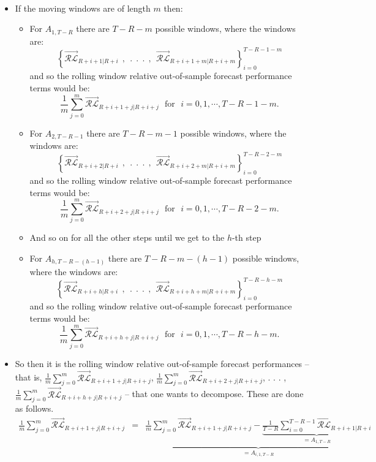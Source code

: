 \documentclass[11pt]{article}
\begin{document}
\begin{itemize}
\begin{eqnarray}
\end{eqnarray}
\item If the moving windows are of length $m$ then:
\begin{itemize}
\item For $A_{1,T\!-\!R}$ there are $T-R-m$ possible windows, where the windows are: 
\[\left\{\overrightarrow{\mathcal{RL}}_{R+i+1|R+i}\ \ , \ \  . \ \  . \ \  . \ \ ,\ \ \overrightarrow{\mathcal{RL}}_{R+i+1+m|R+i+m}\right\}_{i=0}^{T-R-1-m}\] 
and so the rolling window relative out-of-sample forecast performance terms would be:
\[\frac{1}{m}\sum_{j=0}^{m}\overrightarrow{\mathcal{RL}}_{R+i+1+j|R+i+j}\ \ \ \mathrm{for} \ \ \ i=0,1,\cdots,T\!-\!R\!-\!1\!-\!m. \]
\item For $A_{2,T\!-\!R\!-\!1}$ there are $T-R-m-1$ possible windows, where the windows are: 
\[\left\{\overrightarrow{\mathcal{RL}}_{R+i+2|R+i}\ \ , \ \  . \ \  . \ \  . \ \ ,\ \ \overrightarrow{\mathcal{RL}}_{R+i+2+m|R+i+m}\right\}_{i=0}^{T-R-2-m}\] 
and so the rolling window relative out-of-sample forecast performance terms would be:
\[\frac{1}{m}\sum_{j=0}^{m}\overrightarrow{\mathcal{RL}}_{R+i+2+j|R+i+j}\ \ \ \mathrm{for} \ \ \ i=0,1,\cdots,T\!-\!R\!-\!2\!-\!m. \]
\item And so on for all the other steps until we get to the $h$-th step
\item For $A_{h,T\!-\!R\!-\!(h-1)}$ there are $T-R-m-(h-1)$ possible windows, where the windows are: 
\[\left\{\overrightarrow{\mathcal{RL}}_{R+i+h|R+i}\ \ , \ \  . \ \  . \ \  . \ \ ,\ \ \overrightarrow{\mathcal{RL}}_{R+i+h+m|R+i+m}\right\}_{i=0}^{T-R-h-m}\] 
and so the rolling window relative out-of-sample forecast performance terms would be:
\[\frac{1}{m}\sum_{j=0}^{m}\overrightarrow{\mathcal{RL}}_{R+i+h+j|R+i+j}\ \ \ \mathrm{for} \ \ \ i=0,1,\cdots,T\!-\!R\!-\!h\!-\!m. \]
\end{itemize}
\item So then it is the rolling window relative out-of-sample forecast performances -- that is, $\frac{1}{m}\sum_{j=0}^{m}\overrightarrow{\mathcal{RL}}_{R+i+1+j|R+i+j}$, $\frac{1}{m}\sum_{j=0}^{m}\overrightarrow{\mathcal{RL}}_{R+i+2+j|R+i+j}$, . . . , $\frac{1}{m}\sum_{j=0}^{m}\overrightarrow{\mathcal{RL}}_{R+i+h+j|R+i+j}$ -- that one wants to decompose.  These are done as follows.
\begin{eqnarray}
\frac{1}{m}\sum_{j=0}^{m}\overrightarrow{\mathcal{RL}}_{R+i+1+j|R+i+j}\!\!\!\!&=&\!\!\!\!\underbrace{\frac{1}{m}\sum_{j=0}^{m}\overrightarrow{\mathcal{RL}}_{R+i+1+j|R+i+j}-\underbrace{\frac{1}{T\!-\!R}\!\!\sum_{i=0}^{T-R-1}\!\!\overrightarrow{\mathcal{RL}}_{R+i+1|R+i}}_{=A_{1,T\!-\!R}}}_{=A_{i,1,T-R}} \nonumber \\

\end{eqnarray}
\end{itemize}
\end{document}
